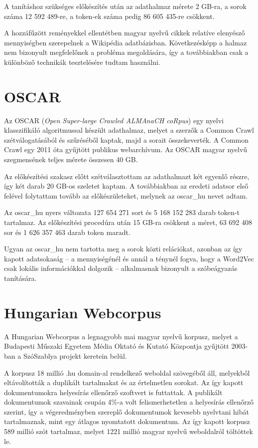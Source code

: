 A tanításhoz szükséges előkészítés után az adathalmaz mérete 2 GB-ra, a sorok száma 12 592 489-re, a token-ek száma pedig 86 605 435-re csökkent.

A hozzáfűzött reményekkel ellentétben magyar nyelvű cikkek relatíve elenyésző mennyiségben szerepelnek a Wikipédia adatbázisban. Következésképp a halmaz nem bizonyult megfelelőnek a probléma megoldására, így a továbbiakban csak a különböző technikák tesztelésére tudtam használni.


\section{OSCAR}

Az OSCAR (\textit{Open Super-large Crawled ALMAnaCH coRpus}) \cite{oscar} egy nyelvi klasszifikáló algoritmussal készült adathalmaz, melyet a szerzők a Common Crawl \cite{common} szétválogatásából és szűréséből kaptak, majd a sorait összekeverték. A Common Crawl egy 2011 óta gyűjtött publikus webarchívum. Az OSCAR magyar nyelvű szegmensének teljes mérete összesen 40 GB. 

Az előkészítési szakasz előtt szétválasztottam az adathalmazt két egyenlő részre, így két darab 20 GB-os szeletet kaptam. A továbbiakban az eredeti adatsor első felével folytattam tovább az előkészületeket, melynek az oscar\_hu nevet adtam.

Az oscar\_hu nyers változata 127 654 271 sort és 5 168 152 283 darab token-t tartalmaz. Az előkészítési procedúra után 15 GB-ra csökkent a méret, 63 692 408 sor és 1 626 357 463 darab token maradt.

Ugyan az oscar\_hu nem tartotta meg a sorok közti relációkat, azonban az így kapott adatsokaság – a mennyiségénél és annál a ténynél fogva, hogy a Word2Vec csak lokális információkkal dolgozik – alkalmasnak bizonyult a szóbeágyazás tanítására.

\section{Hungarian Webcorpus}

A Hungarian Webcorpus \cite{hungarian_webcorpus} a legnagyobb mai magyar nyelvű korpusz, melyet a Budapesti Műszaki Egyetem Média Oktató és Kutató Központja gyűjtött 2003-ban a SzóSzablya projekt keretein belül.

A korpusz 18 millió .hu domain-al rendelkező weboldal szövegéből áll, melyekből eltávolították a duplikált tartalmakat és az értelmetlen sorokat. Az így kapott dokumentumokra helyesírás ellenőrző szoftvert is futtattak. A publikált dokumentumok szavainak csupán 4\%-a volt felismerhetetlen a helyesírás ellenőrző szerint, így a végeredményben szereplő dokumentumok kevesebb nyelvtani hibát tartalmaznak, mint egy átlagos nyomtatott dokumentum. Az így kapott korpusz 589 millió szót tartalmaz, melyet 1221 millió magyar nyelvű weboldalról töltöttek le.

